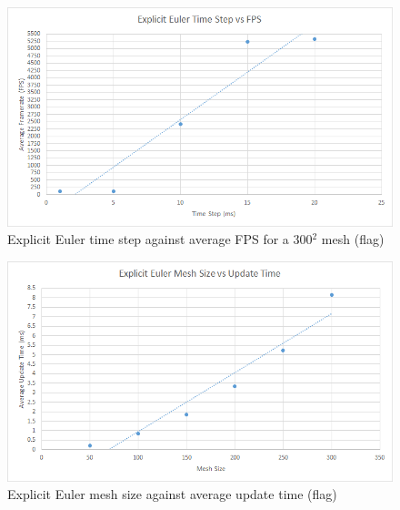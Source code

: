     \begin{figure}
    \begin{center}
      \includegraphics[scale=.9]{Figures/flag_ee_ts_fps}
    \end{center}
    \caption{Explicit Euler time step against average FPS for a 300$^{2}$ mesh (flag)}
    \label{fig:ee step fps flag}
  \end{figure}
  
    \begin{figure}
    \begin{center}
      \includegraphics[scale=.9]{Figures/flag_ee_m_ut}
    \end{center}
    \caption{Explicit Euler mesh size against average update time (flag)}
    \label{fig:ee mesh update flag}
  \end{figure}
  

